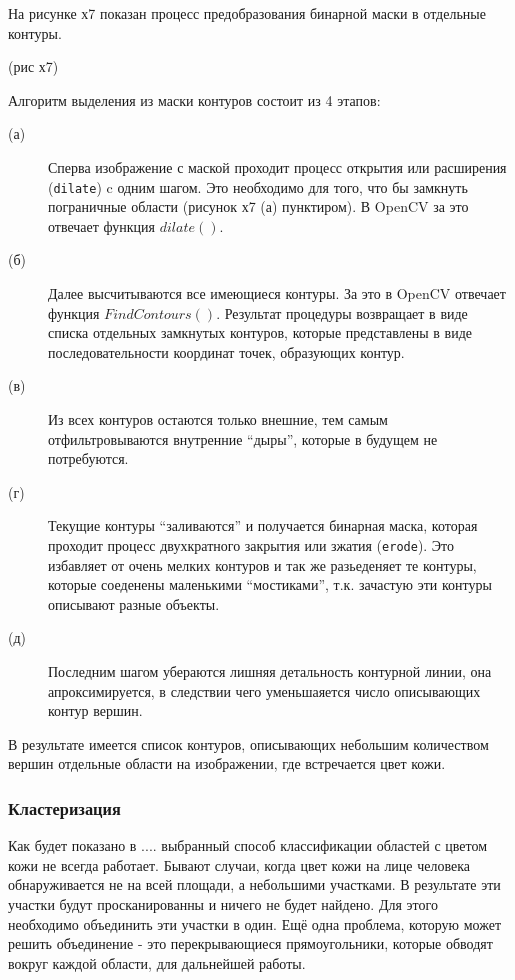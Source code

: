 \documentclass[12pt]{report}
\begin{document}
На рисунке х7 показан процесс предобразования бинарной маски в отдельные контуры.

(рис х7)

Алгоритм выделения из маски контуров состоит из 4 этапов:
\begin{description}
\item[(а)] Сперва изображение с маской проходит процесс открытия или расширения (\texttt{dilate}) c одним шагом. Это необходимо для того, что бы замкнуть пограничные области (рисунок х7 (а) пунктиром). В OpenCV за это отвечает функция $dilate()$.
\item[(б)] Далее высчитываются все имеющиеся контуры. За это в OpenCV отвечает функция $FindContours()$. Результат процедуры возвращает в виде списка отдельных замкнутых контуров, которые представлены в виде последовательности координат точек, образующих контур.
\item[(в)] Из всех контуров остаются только внешние, тем самым отфильтровываются внутренние ``дыры'', которые в будущем не потребуются.
\item[(г)] Текущие контуры ``заливаются'' и получается бинарная маска, которая проходит процесс двухкратного закрытия или зжатия (\texttt{erode}). Это избавляет от очень мелких контуров и так же разьеденяет те контуры, которые соеденены маленькими ``мостиками'', т.к. зачастую эти контуры описывают разные объекты.
\item[(д)] Последним шагом убераются лишняя детальность контурной линии, она апроксимируется, в следствии чего уменьшаяется число описывающих контур вершин.
\end{description}

В результате имеется список контуров, описывающих небольшим количеством вершин отдельные области на изображении, где встречается цвет кожи.

\subsubsection{Кластеризация}
Как будет показано в .... выбранный способ классификации областей с цветом кожи не всегда работает. Бывают случаи, когда цвет кожи на лице человека обнаруживается не на всей площади, а небольшими участками. В результате эти участки будут просканированны и ничего не будет найдено. Для этого необходимо объединить эти участки в один. Ещё одна проблема, которую может решить объединение - это перекрывающиеся прямоугольники, которые обводят вокруг каждой области, для дальнейшей работы.
\end{document}
